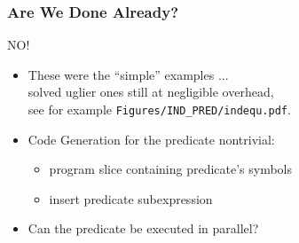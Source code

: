 \documentclass{beamer}
\begin{document}


\begin{frame}[fragile,t]
  \frametitle{Are We Done Already?}

\alert{NO!}
\bigskip

\begin{itemize}
    \item These were the ``simple'' examples ...\\ 
            solved uglier ones still at negligible overhead,\\
            see for example {\tt Figures/IND\_PRED/indequ.pdf}.\bigskip

    \item Code Generation for the predicate nontrivial:
            \begin{itemize}
                \item program slice containing predicate's symbols
                \item insert predicate subexpression 
            \end{itemize}\bigskip

    \item Can the predicate be executed in parallel?
\end{itemize}

\end{frame}


\end{document}
